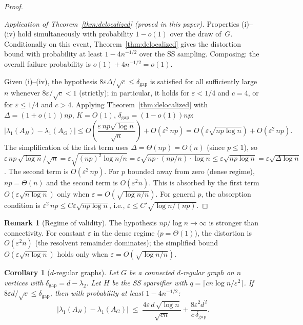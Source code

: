 \documentclass[11pt]{article}
\newtheorem{corollary}[theorem]{Corollary}
\theoremstyle{definition}
\newtheorem{remark}[theorem]{Remark}
\newcommand{\eps}{\varepsilon}
\newcommand{\lamH}{\lambda_1(A_H)}
\newcommand{\lamG}{\lambda_1(A_G)}
\begin{document}
\begin{proof}
\begin{enumerate}[label=(\roman*),nosep]
\end{enumerate}


\noindent\emph{Application of Theorem~\ref{thm:delocalized} (proved in this paper).}
Properties (i)--(iv) hold simultaneously with probability $1 - o(1)$ over the
draw of~$G$.
Conditionally on this event, Theorem~\ref{thm:delocalized} gives the distortion bound
with probability at least $1 - 4n^{-1/2}$ over the SS sampling.
Composing: the overall failure probability is $o(1) + 4n^{-1/2} = o(1)$.

Given (i)--(iv), the hypothesis $8\eps\Delta/\sqrt{c} \leq \delta_{\mathrm{gap}}$ is
satisfied for all sufficiently large $n$ whenever $8\eps/\sqrt{c} < 1$ (strictly);
in particular, it holds for $\eps < 1/4$ and $c = 4$, or for $\eps \leq 1/4$ and $c > 4$.
Applying Theorem~\ref{thm:delocalized} with $\Delta = (1+o(1))np$, $K = O(1)$,
$\delta_{\mathrm{gap}} = (1-o(1))np$:
\[
|\lamH - \lamG|
\leq O\!\left(\frac{\eps\,np\sqrt{\log n}}{\sqrt{n}}\right) + O(\eps^2\,np)
= O(\eps\sqrt{np\log n}) + O(\eps^2\,np).
\]
The simplification of the first term uses $\Delta = \Theta(np) = O(n)$ (since $p \leq 1$),
so $\eps\,np\,\sqrt{\log n}/\sqrt{n}
= \eps\sqrt{(np)^2\log n / n}
= \eps\sqrt{np \cdot (np/n) \cdot \log n}
\leq \eps\sqrt{np\log n}
= \eps\sqrt{\Delta\log n}$.
The second term is $O(\eps^2\,np)$. For $p$ bounded away from zero (dense regime),
$np = \Theta(n)$ and the second term is $O(\eps^2 n)$. This is absorbed by the first
term $O(\eps\sqrt{n\log n})$ only when $\eps = O(\sqrt{\log n/n})$.
For general $p$, the absorption condition is $\eps^2\,np \leq C\eps\sqrt{np\log n}$,
i.e., $\eps \leq C'\sqrt{\log n/(np)}$.
\end{proof}

\begin{remark}[Regime of validity]
The hypothesis $np/\log n \to \infty$ is stronger than connectivity. For
constant $\eps$ in the dense regime ($p = \Theta(1)$), the distortion is
$O(\eps^2 n)$ (the resolvent remainder dominates); the simplified bound
$O(\eps\sqrt{n\log n})$ holds only when $\eps = O(\sqrt{\log n/n})$.
\end{remark}

\begin{corollary}[$d$-regular graphs]\label{cor:regular-deloc}
Let $G$ be a connected $d$-regular graph on $n$ vertices with
$\delta_{\mathrm{gap}} = d - \lambda_2$. Let $H$ be the SS sparsifier with
$q = \lceil cn\log n/\eps^2\rceil$. If $8\eps d/\sqrt{c} \leq \delta_{\mathrm{gap}}$,
then with probability at least $1 - 4n^{-1/2}$:
\[
|\lamH - \lamG| \;\leq\;
\frac{4\eps\, d\,\sqrt{\log n}}{\sqrt{cn}}
+ \frac{8\eps^2 d^2}{c\,\delta_{\mathrm{gap}}}.
\]
\end{corollary}
\end{document}
